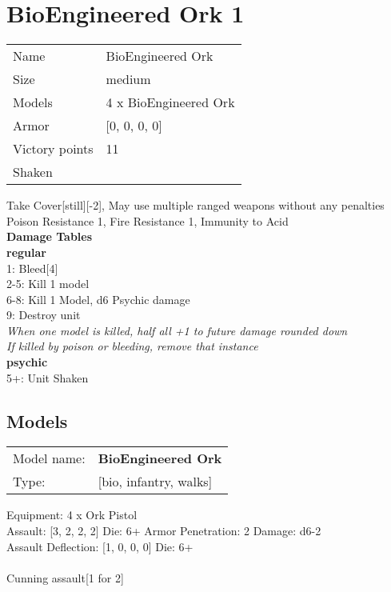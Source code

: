 \clearpage

\section{ BioEngineered Ork 1 }

\begin{tabular}{ll}
  Name & BioEngineered Ork \\
  Size & medium\\
  Models & 4 x BioEngineered Ork\\
  Armor & [0, 0, 0, 0]\\
  Victory points & 11\\
  Shaken & \\
\end{tabular}

Take Cover[still][-2], May use multiple ranged weapons without any penalties\\ 
Poison Resistance 1, Fire Resistance 1, Immunity to Acid\\ 



{\bf Damage Tables} \\
 {\bf regular } \\
1: Bleed[4] \\
2-5: Kill 1 model \\
6-8: Kill 1 Model, d6 Psychic damage \\
9: Destroy unit \\
{{\it When one model is killed, half all +1 to future damage rounded down}} \\
{{\it If killed by poison or bleeding, remove that instance}} \\
 {\bf psychic } \\
5+: Unit Shaken \\


\clearpage

\subsection{ Models }

\begin{tabular}{ll}
Model name: & {\bf BioEngineered Ork } \\
Type: & [bio, infantry, walks] \\
\end{tabular}

Equipment: 4 x Ork Pistol \\

Assault: [3, 2, 2, 2] Die: 6+ Armor Penetration: 2 Damage: d6-2 \\
Assault Deflection: [1, 0, 0, 0] Die: 6+\\
\\ 
Cunning assault[1 for 2]\\ 
 



